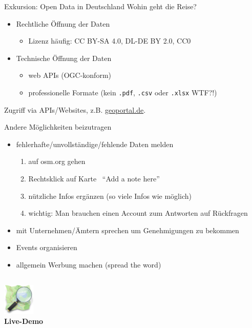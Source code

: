 \documentclass{beamer}
\begin{document}
			\begin{frame}{Exkursion: Open Data in Deutschland}
				Wohin geht die Reise?
				\begin{itemize}
					\item Rechtliche Öffnung der Daten
					\begin{itemize}
						\item Lizenz häufig: CC BY-SA 4.0, DL-DE BY 2.0, CC0
					\end{itemize}\pause
					\item Technische Öffnung der Daten
					\begin{itemize}
						\item web APIs (OGC-konform)
						\item professionelle Formate (kein \texttt{.pdf}, \texttt{.csv} oder \texttt{.xlsx} WTF?!)
					\end{itemize}
				\end{itemize}
				\pause
				\vspace{0.25cm}
				Zugriff via APIs/Websites, z.B. \href{https://www.geoportal.de/}{geoportal.de}.
			\end{frame}
			
			\begin{frame}{Andere Möglichkeiten beizutragen}
				\begin{itemize}
					\item fehlerhafte/unvollständige/fehlende Daten melden
					\begin{enumerate}
						\item auf osm.org gehen
						\item Rechtsklick auf Karte \textrightarrow\ \enquote{Add a note here}
						\item nützliche Infos ergänzen (so viele Infos wie möglich)
						\item wichtig: Man brauchen einen Account zum Antworten auf Rückfragen
					\end{enumerate}\pause
					\item mit Unternehmen/Ämtern sprechen um Genehmigungen zu bekommen\pause
					\item Events organisieren\pause
					\item allgemein Werbung machen (spread the word)
				\end{itemize}
			\end{frame}
			
		\subsection{}
			
			\begin{frame}
				\begin{center}
					\includegraphics[width=1.5cm]{images/openstreetmap-logo.png}\\
					\vspace{0.5cm}
					\textbf{Live-Demo}
				\end{center}
			\end{frame}
\end{document}
